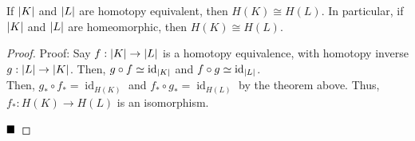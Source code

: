 \begin{lemma}
    If $\left\lvert {K} \right\rvert$ and $\left\lvert {L} \right\rvert$ are homotopy equivalent, then $H(K) \cong H(L)$. In particular, if $\left\lvert {K} \right\rvert$ and $\left\lvert {L} \right\rvert$ are homeomorphic, then $H(K) \cong H(L)$.
\end{lemma}
\begin{proof}{Proof:}
    Say $f : \left\lvert {K} \right\rvert \to \left\lvert {L} \right\rvert$ is a homotopy equivalence, with homotopy inverse $g : \left\lvert {L} \right\rvert \to \left\lvert {K} \right\rvert$. Then, $g \circ f \simeq \operatorname{id}_{\left\lvert {K} \right\rvert}$ and $f \circ g \simeq \operatorname{id}_{\left\lvert {L} \right\rvert}$.\\

    Then, $g_* \circ f_* = \operatorname{id}_{H(K)}$ and $f_* \circ g_* = \operatorname{id}_{H(L)}$ by the theorem above. Thus, $f_* : H(K) \to H(L)$ is an isomorphism.

    $\qed$
\end{proof}
